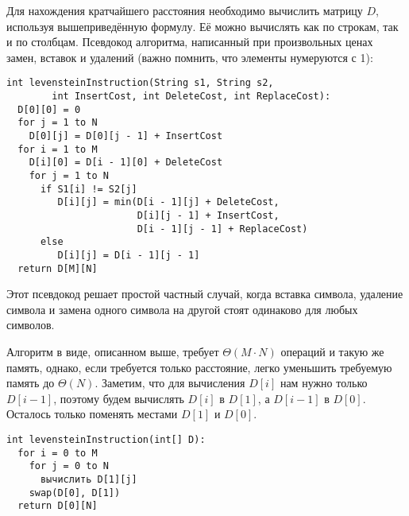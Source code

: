 Для нахождения кратчайшего расстояния необходимо вычислить матрицу $D$, используя вышеприведённую формулу.
Её можно вычислять как по строкам, так и по столбцам.
Псевдокод алгоритма, написанный при произвольных ценах замен, вставок и удалений (важно помнить, что элементы нумеруются с 1):

\begin{verbatim}
int levensteinInstruction(String s1, String s2,
        int InsertCost, int DeleteCost, int ReplaceCost):
  D[0][0] = 0
  for j = 1 to N
    D[0][j] = D[0][j - 1] + InsertCost                  
  for i = 1 to M
    D[i][0] = D[i - 1][0] + DeleteCost                  
    for j = 1 to N
      if S1[i] != S2[j] 
         D[i][j] = min(D[i - 1][j] + DeleteCost,        
                       D[i][j - 1] + InsertCost,                      
                       D[i - 1][j - 1] + ReplaceCost)                 
      else 
         D[i][j] = D[i - 1][j - 1]
  return D[M][N]
\end{verbatim}

Этот псевдокод решает простой частный случай, когда вставка символа, удаление символа и замена одного символа на другой стоят одинаково для любых символов.

Алгоритм в виде, описанном выше, требует $\Theta(M \cdot N)$ операций и такую же память, однако, если требуется только расстояние, легко уменьшить требуемую память до $\Theta(N)$.
Заметим, что для вычисления $D[i]$ нам нужно только $D[i-1]$, поэтому будем вычислять $D[i]$ в $D[1]$, а $D[i-1]$ в $D[0]$.
Осталось только поменять местами $D[1]$ и $D[0]$.

\begin{verbatim}
int levensteinInstruction(int[] D):
  for i = 0 to M
    for j = 0 to N
      вычислить D[1][j]
    swap(D[0], D[1])
  return D[0][N]
\end{verbatim}
